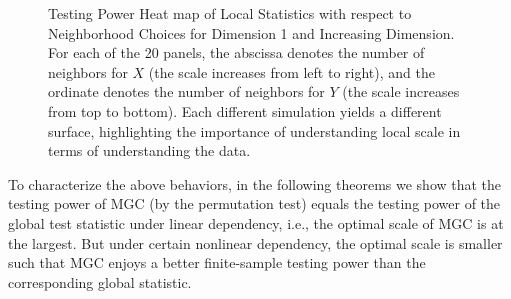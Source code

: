 \documentclass[11pt]{article}
\begin{document}
\begin{figure}[htbp]
\hfil
{}
\caption{Testing Power Heat map of Local Statistics with respect to Neighborhood Choices for Dimension 1 and Increasing Dimension.
For each of the 20 panels, the abscissa denotes the number of neighbors for $X$ (the scale increases from left to right), and the ordinate denotes the number of neighbors for $Y$ (the scale increases from top to bottom).  Each different simulation yields a different surface, highlighting the importance of understanding local scale in terms of understanding the data.}
\label{figSim2}
\end{figure}

To characterize the above behaviors, in the following theorems we show that the testing power of MGC (by the permutation test) equals the testing power of the global test statistic under linear dependency, i.e., the optimal scale of MGC is at the largest. But under certain nonlinear dependency, the optimal scale is smaller such that MGC enjoys a better finite-sample testing power than the corresponding global statistic. 
\end{document}
